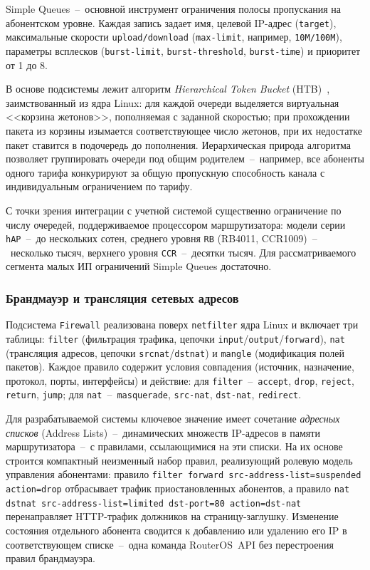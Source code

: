 Simple Queues~--~основной инструмент ограничения полосы пропускания на абонентском уровне. Каждая запись задает имя, целевой IP-адрес (\texttt{target}), максимальные скорости \texttt{upload/download} (\texttt{max-limit}, например, \texttt{10M/100M}), параметры всплесков (\texttt{burst-limit}, \texttt{burst-threshold}, \texttt{burst-time}) и приоритет от 1 до 8.

В основе подсистемы лежит алгоритм \emph{Hierarchical Token Bucket} (HTB)~\cite{burton,mikrotikwiki}, заимствованный из ядра Linux: для каждой очереди выделяется виртуальная <<корзина жетонов>>, пополняемая с заданной скоростью; при прохождении пакета из корзины изымается соответствующее число жетонов, при их недостатке пакет ставится в подочередь до пополнения. Иерархическая природа алгоритма позволяет группировать очереди под общим родителем~--~например, все абоненты одного тарифа конкурируют за общую пропускную способность канала с индивидуальным ограничением по тарифу.

С точки зрения интеграции с учетной системой существенно ограничение по числу очередей, поддерживаемое процессором маршрутизатора: модели серии \texttt{hAP}~--~до нескольких сотен, среднего уровня \texttt{RB} (RB4011, CCR1009)~--~несколько тысяч, верхнего уровня \texttt{CCR}~--~десятки тысяч. Для рассматриваемого сегмента малых ИП ограничений Simple Queues достаточно.

\subsubsection{Брандмауэр и трансляция сетевых адресов}

Подсистема \texttt{Firewall} реализована поверх \texttt{netfilter} ядра Linux и включает три таблицы: \texttt{filter} (фильтрация трафика, цепочки \texttt{input}/\texttt{output}/\texttt{forward}), \texttt{nat} (трансляция адресов, цепочки \texttt{srcnat}/\texttt{dstnat}) и \texttt{mangle} (модификация полей пакетов). Каждое правило содержит условия совпадения (источник, назначение, протокол, порты, интерфейсы) и действие: для \texttt{filter}~--~\texttt{accept}, \texttt{drop}, \texttt{reject}, \texttt{return}, \texttt{jump}; для \texttt{nat}~--~\texttt{masquerade}, \texttt{src-nat}, \texttt{dst-nat}, \texttt{redirect}.

Для разрабатываемой системы ключевое значение имеет сочетание \emph{адресных списков} (Address Lists)~--~динамических множеств IP-адресов в памяти маршрутизатора~--~с правилами, ссылающимися на эти списки. На их основе строится компактный неизменный набор правил, реализующий ролевую модель управления абонентами: правило \texttt{filter forward src-address-list=suspended action=drop} отбрасывает трафик приостановленных абонентов, а правило \texttt{nat dstnat src-address-list=limited dst-port=80 action=dst-nat} перенаправляет HTTP-трафик должников на страницу-заглушку. Изменение состояния отдельного абонента сводится к добавлению или удалению его IP в соответствующем списке~--~одна команда RouterOS~API без перестроения правил брандмауэра.


